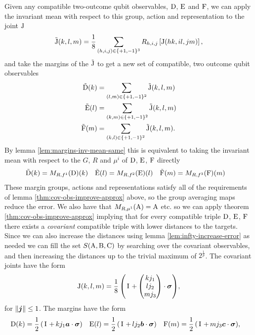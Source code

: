Given any compatible two-outcome qubit observables, $\operatorname{D}$, $\operatorname{E}$ and $\operatorname{F}$, we can apply the invariant mean with respect to this group, action and representation to the joint $\operatorname{J}$
\begin{equation}
  \tilde{\operatorname{J}}(k,l,m) = \frac{1}{8}\sum_{(h,i,j)\in\{+1,-1\}^3} R_{{h}, {i}, {j}}\left[\operatorname{J}(hk, il, jm) \right],
\end{equation}
and take the margins of the $\tilde{\operatorname{J}}$ to get a new set of compatible, two outcome qubit observables
\begin{align}
  \tilde{\operatorname{D}}(k) &= \sum_{(l,m)\in\{+1,-1\}^2}\tilde{\operatorname{J}}(k,l,m)\\
  \tilde{\operatorname{E}}(l) &= \sum_{(k,m)\in\{+1,-1\}^2}\tilde{\operatorname{J}}(k,l,m)\\
  \tilde{\operatorname{F}}(m) &= \sum_{(k,l)\in\{+1,-1\}^2}\tilde{\operatorname{J}}(k,l,m).
\end{align}
By lemma \ref{lem:margins-inv-mean-same} this is equivalent to taking the invariant mean with respect to the $G$, $R$ and $\mu^i$ of $\operatorname{D}$, $\operatorname{E}$, $\operatorname{F}$ directly
\begin{align}
  \tilde{\operatorname{D}}(k) &= M_{R,f^1}(\operatorname{D})(k) & \tilde{\operatorname{E}}(l) &= M_{R,f^2}(\operatorname{E})(l) & \tilde{\operatorname{F}}(m) &= M_{R,f^3}(\operatorname{F})(m)
\end{align}
These margin groups, actions and representations satisfy all of the requirements of lemma \ref{thm:cov-obs-improve-approx} above, so the group averaging maps reduce the error. We also have that $M_{R,\mu^1}(\operatorname{A}) = \operatorname{A}$ etc. so we can apply theorem \ref{thm:cov-obs-improve-approx} implying that for every compatible triple $\operatorname{D}$, $\operatorname{E}$, $\operatorname{F}$ there exists a \emph{covariant} compatible triple with lower distances to the targets. Since we can also increase the distances using lemma \ref{lem:infty-increase-error} as needed we can fill the set $S(\operatorname{A}, \operatorname{B}, \operatorname{C})$ by searching over the covariant observables, and then increasing the distances up to the trivial maximum of $2^{\frac{1}{p}}$.
The covariant joints have the form
\begin{align}
  \opj(k,l,m) = \qbit[][+][\frac{1}{8}]{\begin{pmatrix}k j_1\\ l j_2 \\ m j_3\end{pmatrix}},
\end{align}
for ${\left\lVert{\bm{j}}\right\rVert}\leq 1$. The margins have the form
\begin{align}
  \opd(k) &= \qbit{k j_1 \boa} &
                               \ope(l) &= \qbit{l j_2 \bob}&
                                                           \opf(m) &= \qbit{m j_3 \boc},
\end{align}
